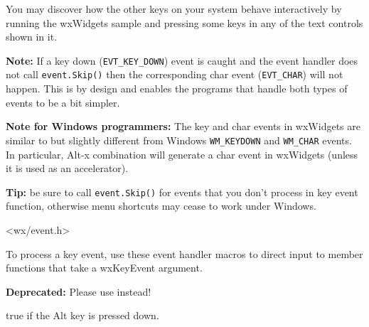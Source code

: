You may discover how the other keys on your system behave interactively by
running the  wxWidgets sample and pressing some keys
in any of the text controls shown in it.

{\bf Note:} If a key down ({\tt EVT\_KEY\_DOWN}) event is caught and
the event handler does not call {\tt event.Skip()} then the corresponding
char event ({\tt EVT\_CHAR}) will not happen.  This is by design and
enables the programs that handle both types of events to be a bit
simpler.

{\bf Note for Windows programmers:} The key and char events in wxWidgets are
similar to but slightly different from Windows {\tt WM\_KEYDOWN} and
{\tt WM\_CHAR} events. In particular, Alt-x combination will generate a char
event in wxWidgets (unless it is used as an accelerator).

{\bf Tip:} be sure to call {\tt event.Skip()} for events that you don't process in
key event function, otherwise menu shortcuts may cease to work under Windows.




<wx/event.h>


To process a key event, use these event handler macros to direct input to member
functions that take a wxKeyEvent argument.

\twocolwidtha{7cm}
\begin{twocollist}\itemsep=0pt
\end{twocollist}%




\label{wxkeyeventmaltdown}


\textbf{Deprecated: } Please use 
instead!

true if the Alt key is pressed down.


\label{wxkeyeventmcontroldown}

